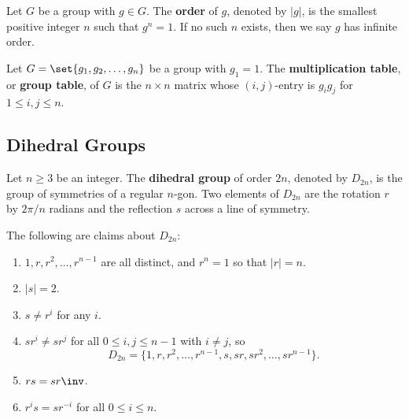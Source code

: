  Let $G$ be a group with $g \in G$. The \textbf{order} of $g$, denoted by $|g|$, is the smallest positive integer $n$ such that $g^n = 1$. If no such $n$ exists, then we say $g$ has infinite order.

 Let $G = \set{g_1, g_2, \ldots, g_n}$ be a group with $g_1 = 1$. The \textbf{multiplication table}, or \textbf{group table}, of $G$ is the $n \times n$ matrix whose $(i, j)$-entry is $g_i g_j$ for $1 \leq i, j \leq n$.

\newpage

\subsection{Dihedral Groups} \label{sec1.2}

 Let $n \geq 3$ be an integer. The \textbf{dihedral group} of order $2n$, denoted by $D_{2n}$, is the group of symmetries of a regular $n$-gon. Two elements of $D_{2n}$ are the rotation $r$ by $2\pi/n$ radians and the reflection $s$ across a line of symmetry.

\note The following are claims about $D_{2n}$:
\begin{enumerate}
    \item $1, r, r^2, \ldots, r^{n - 1}$ are all distinct, and $r^n = 1$ so that $|r| = n$.
    \item $|s| = 2$.
    \item $s \neq r^i$ for any $i$.
    \item $sr^i \neq sr^j$ for all $0 \leq i, j \leq n - 1$ with $i \neq j$, so
    \[D_{2n} = \{1, r, r^2, \ldots, r^{n-1}, s, sr, sr^2, \ldots, sr^{n-1}\}.\]
    \item $rs = sr\inv$.
    \item $r^is = sr^{-i}$ for all $0 \leq i \leq n$.
\end{enumerate}

